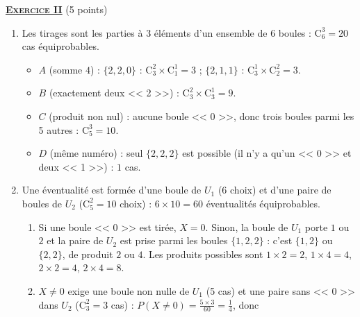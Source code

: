 \noindent \underline{\textsc{\textbf{Exercice II}}} (5 points)
\begin{enumerate}
   \item {}
      Les tirages sont les parties \`a 3 \'el\'ements d'un ensemble de 6 boules : $\mathrm{C}_6^3 = 20$ cas \'equiprobables.
      \begin{itemize}
         \item $A$ (somme $4$) : $\{2, 2, 0\}$ : $\mathrm{C}_3^2 \times \mathrm{C}_1^1 = 3$ ; $\{2, 1, 1\}$ : $\mathrm{C}_3^1 \times \mathrm{C}_2^2 = 3$.
            \par\noindent{}
         \item $B$ (exactement deux << 2 >>) : $\mathrm{C}_3^2 \times \mathrm{C}_3^1 = 9$.
            \par\noindent{}
         \item $C$ (produit non nul) : aucune boule << 0 >>, donc trois boules parmi les 5 autres : $\mathrm{C}_5^3 = 10$.
            \par\noindent{}
         \item $D$ (m\^eme num\'ero) : seul $\{2,2,2\}$ est possible (il n'y a qu'un << 0 >> et deux << 1 >>) : $1$ cas.
            \par\noindent{}
      \end{itemize}
   \item Une \'eventualit\'e est form\'ee d'une boule de $U_1$ (6 choix) et d'une paire de boules de $U_2$ ($\mathrm{C}_5^2 = 10$ choix) :
      $6 \times 10 = 60$ \'eventualit\'es \'equiprobables.
      \begin{enumerate}
         \item {}
            Si une boule << 0 >> est tir\'ee, $X = 0$. Sinon, la boule de $U_1$ porte $1$ ou $2$ et la paire de $U_2$ est
            prise parmi les boules $\{1, 2, 2\}$ : c'est $\{1, 2\}$ ou $\{2, 2\}$, de produit $2$ ou $4$.
            Les produits possibles sont $1\times2 = 2$, $1 \times 4 = 4$, $2 \times 2 = 4$, $2 \times 4 = 8$.
            \par\noindent{}
         \item {}
            $X \neq 0$ exige une boule non nulle de $U_1$ (5 cas) et une paire sans << 0 >> dans $U_2$ ($\mathrm{C}_3^2 = 3$ cas) :
            $P(X \neq 0) = \frac{5 \times 3}{60} = \frac{1}{4}$, donc 


\end{enumerate}
\end{enumerate}

